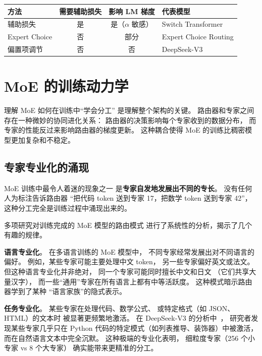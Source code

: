 \begin{keybox}[负载均衡方法对比]
\begin{center}\small
\renewcommand{\arraystretch}{1.3}
\begin{tabular}{lccl}
  \toprule
  \rowcolor{figLightGray}
  \textbf{方法} & \textbf{需要辅助损失} & \textbf{影响 LM 梯度}
  & \textbf{代表模型} \\
  \midrule
  辅助损失 & 是 & 是（$\alpha$ 敏感） & Switch Transformer \\
  Expert Choice & 否 & 部分 & Expert Choice Routing \\
  偏置项调节 & 否 & 否 & DeepSeek-V3 \\
  \bottomrule
\end{tabular}
\end{center}
\end{keybox}

\section{MoE 的训练动力学}

理解 MoE 如何在训练中“学会分工”
是理解整个架构的关键。
路由器和专家之间存在一种微妙的协同进化关系：
路由器的决策影响每个专家收到的数据分布，
而专家的性能反过来影响路由器的梯度更新。
这种耦合使得 MoE 的训练比稠密模型更加复杂和不稳定。

\subsection{专家专业化的涌现}

MoE 训练中最令人着迷的现象之一
是\textbf{专家自发地发展出不同的专长}。
没有任何人为标注告诉路由器
“把代码 token 送到专家 17，把数学 token 送到专家 42”，
这种分工完全是训练过程中涌现出来的。

多项研究对训练完成的 MoE 模型的路由模式
进行了系统性的分析，揭示了几个有趣的规律。

\textbf{语言专业化}。
在多语言训练的 MoE 模型中，
不同专家经常发展出对不同语言的偏好。
例如，某些专家可能主要处理中文 token，
另一些专家偏好英文或法文。
但这种语言专业化并非绝对，
同一个专家可能同时擅长中文和日文
（它们共享大量汉字），
而一些“通用”专家在所有语言上都有中等活跃度。
这种模式暗示路由器学到了某种
“语言家族”的隐式表示。

\textbf{任务专业化}。
某些专家在处理代码、数学公式、
或特定格式（如 JSON、HTML）的文本时
被显著更频繁地激活。
在 DeepSeek-V3 的分析中~\cite{deepseekv3}，
研究者发现某些专家几乎只在
Python 代码的特定模式（如列表推导、装饰器）中被激活，
而在自然语言文本中完全沉默。
这种极端的专业化表明，
细粒度专家（256 个小专家 vs 8 个大专家）
确实能带来更精准的分工。


